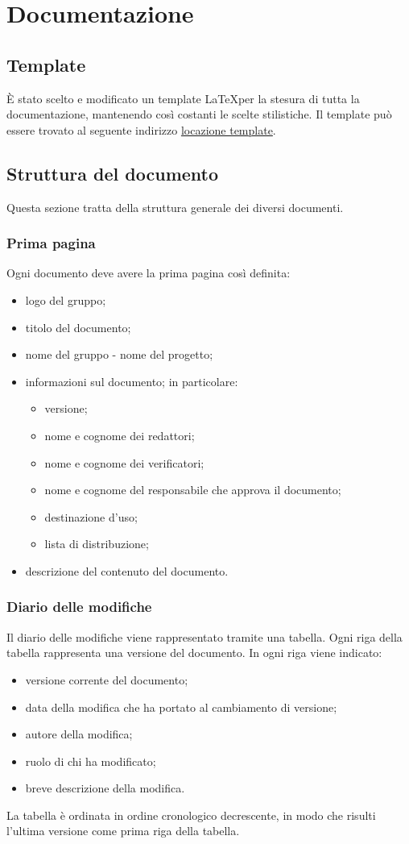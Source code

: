 \section{Documentazione}

\subsection{Template}
È stato scelto e modificato un template \LaTeX per la stesura di tutta la documentazione, mantenendo così costanti le scelte stilistiche. Il template può essere trovato al seguente indirizzo \url{locazione template}.

\subsection{Struttura del documento}
Questa sezione tratta della struttura generale dei diversi documenti.

\subsubsection{Prima pagina}
Ogni documento deve avere la prima pagina così definita:
\begin{itemize}
\item logo del gruppo;
\item titolo del documento;
\item nome del gruppo - nome del progetto;
\item informazioni sul documento; in particolare:
	\begin{itemize}
		\item versione;
		\item nome e cognome dei redattori;
		\item nome e cognome dei verificatori;
		\item nome e cognome del responsabile che approva il documento;
		\item destinazione d'uso;
		\item lista di distribuzione; 
	\end{itemize}
\item descrizione del contenuto del documento.
\end{itemize}

\subsubsection{Diario delle modifiche}
Il diario delle modifiche viene rappresentato tramite una tabella. Ogni riga della tabella rappresenta una versione del documento. In ogni riga viene indicato: 
\begin{itemize}
	\item versione corrente del documento; 
	\item data della modifica che ha portato al cambiamento di versione; 
	\item autore della modifica;
	\item ruolo di chi ha modificato; 
	\item breve descrizione della modifica. 
\end{itemize}
La tabella è ordinata in ordine cronologico decrescente, in modo che risulti l'ultima versione come prima riga della tabella.

